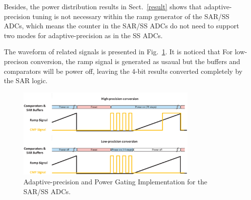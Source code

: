 Besides, the power distribution results in Sect.~\ref{result} shows that adaptive-precision tuning is not necessary within the ramp generator of the SAR/SS ADCs, which means the counter in the SAR/SS ADCs do not need to support two modes for adaptive-precision as in the SS ADCs.

The waveform of related signals is presented in Fig.~\ref{SAR_pg}. It is noticed that For low-precison conversion, the ramp signal is generated as usaual but the buffers and comparators will be power off, leaving the 4-bit results converted completely by the SAR logic. 

\begin{figure}[htbp]
	\centerline{\includegraphics[width=3.5in]{./Figures/SAR_pg.eps}}
	\caption{Adaptive-precision and Power Gating Implementation for the SAR/SS ADCs.}
	\label{SAR_pg}
\end{figure} 